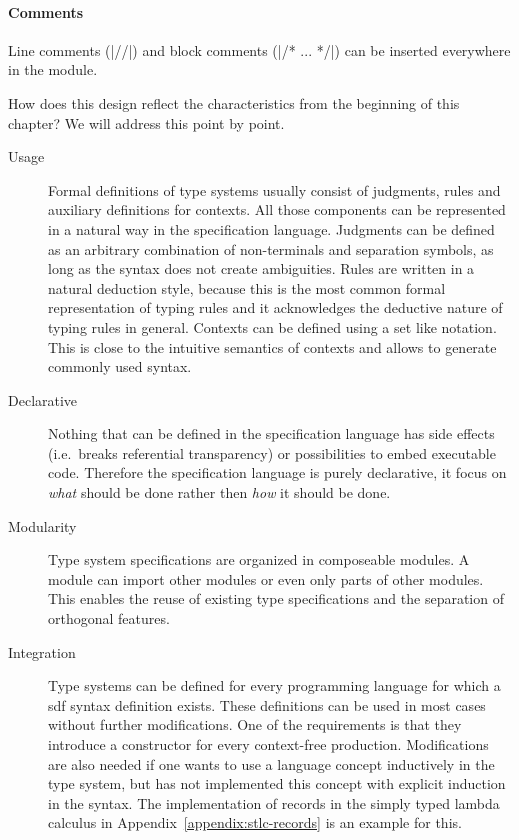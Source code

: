 \paragraph{Comments} Line comments (\code|//|) and block comments
(\code|/* ... */|) can be inserted everywhere in the module.


How does this design reflect the characteristics from the beginning of
this chapter? We will address this point by point.

\begin{description}
\item[Usage] Formal definitions of type systems usually consist of
  judgments, rules and auxiliary definitions for contexts. All those
  components can be represented in a natural way in the specification
  language. Judgments can be defined as an arbitrary combination of
  non-terminals and separation symbols, as long as the syntax does not
  create ambiguities. Rules are written in a natural deduction style,
  because this is the most common formal representation of typing
  rules and it acknowledges the deductive nature of typing rules in
  general. Contexts can be defined using a set like notation. This is
  close to the intuitive semantics of contexts and allows to generate
  commonly used syntax.
\item[Declarative] Nothing that can be defined in the specification
  language has side effects (i.e.\ breaks referential transparency) or
  possibilities to embed executable code. Therefore the specification
  language is purely declarative, it focus on \emph{what} should be
  done rather then \emph{how} it should be done.
\item[Modularity] Type system specifications are organized in
  composeable modules. A module can import other modules or even only
  parts of other modules. This enables the reuse of existing type
  specifications and the separation of orthogonal features.
\item[Integration] Type systems can be defined for every programming
  language for which a \gls{sdf} syntax definition exists. These
  definitions can be used in most cases without further
  modifications. One of the requirements is that they introduce a
  constructor for every context-free production. Modifications are
  also needed if one wants to use a language concept inductively in
  the type system, but has not implemented this concept with explicit
  induction in the syntax. The implementation of records in the simply
  typed lambda calculus in Appendix~\ref{appendix:stlc-records} is an
  example for this.
\end{description}
